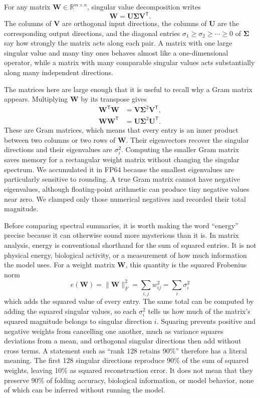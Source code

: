 \documentclass[11pt]{article}
\newcommand{\R}{\mathbb{R}}
\newcommand{\mat}[1]{\mathbf{#1}}
\begin{document}
For any matrix $\mat{W}\in\R^{m\times n}$, singular value decomposition writes
\begin{equation}
\mat{W}=\mat{U}\mat{\Sigma}\mat{V}^{\mathsf T}.
\label{eq:svd}
\end{equation}
The columns of $\mat{V}$ are orthogonal input directions, the columns of $\mat{U}$ are the corresponding output directions, and the diagonal entries $\sigma_1\ge\sigma_2\ge\cdots\ge0$ of $\mat{\Sigma}$ say how strongly the matrix acts along each pair. A matrix with one large singular value and many tiny ones behaves almost like a one-dimensional operator, while a matrix with many comparable singular values acts substantially along many independent directions.

The matrices here are large enough that it is useful to recall why a Gram matrix appears. Multiplying $\mat{W}$ by its transpose gives
\begin{align}
\mat{W}^{\mathsf T}\mat{W}
&=\mat{V}\mat{\Sigma}^2\mat{V}^{\mathsf T}, \\
\mat{W}\mat{W}^{\mathsf T}
&=\mat{U}\mat{\Sigma}^2\mat{U}^{\mathsf T}.
\end{align}
These are Gram matrices, which means that every entry is an inner product between two columns or two rows of $\mat{W}$. Their eigenvectors recover the singular directions and their eigenvalues are $\sigma_i^2$. Computing the smaller Gram matrix saves memory for a rectangular weight matrix without changing the singular spectrum. We accumulated it in FP64 because the smallest eigenvalues are particularly sensitive to rounding. A true Gram matrix cannot have negative eigenvalues, although floating-point arithmetic can produce tiny negative values near zero. We clamped only those numerical negatives and recorded their total magnitude.

Before comparing spectral summaries, it is worth making the word ``energy'' precise because it can otherwise sound more mysterious than it is. In matrix analysis, energy is conventional shorthand for the sum of squared entries. It is not physical energy, biological activity, or a measurement of how much information the model uses. For a weight matrix $\mat{W}$, this quantity is the squared Frobenius norm
\begin{equation}
e(\mat{W})=\|\mat{W}\|_F^2
=\sum_{i,j}w_{ij}^2
=\sum_i\sigma_i^2
\end{equation}
which adds the squared value of every entry. The same total can be computed by adding the squared singular values, so each $\sigma_i^2$ tells us how much of the matrix's squared magnitude belongs to singular direction $i$. Squaring prevents positive and negative weights from cancelling one another, much as variance squares deviations from a mean, and orthogonal singular directions then add without cross terms. A statement such as ``rank 128 retains 90\%'' therefore has a literal meaning. The first 128 singular directions reproduce 90\% of the sum of squared weights, leaving 10\% as squared reconstruction error. It does not mean that they preserve 90\% of folding accuracy, biological information, or model behavior, none of which can be inferred without running the model.
\end{document}
